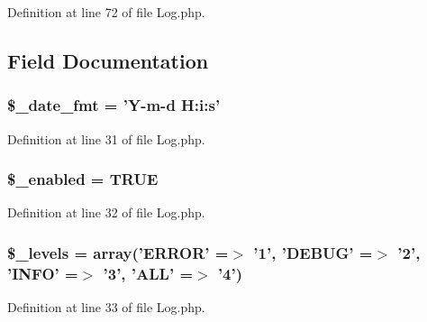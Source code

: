 Definition at line 72 of file Log.\-php.



\subsection{Field Documentation}
\hypertarget{class_c_i___log_aab5c1870169c8e04ede18245f04ad85c}{
\subsubsection[{\$\-\_\-date\-\_\-fmt}]{\setlength{\rightskip}{0pt plus 5cm}\$\-\_\-date\-\_\-fmt = 'Y-\/m-\/{\bf d} H\-:i\-:s'\hspace{0.3cm}{\ttfamily [protected]}}}\label{class_c_i___log_aab5c1870169c8e04ede18245f04ad85c}


Definition at line 31 of file Log.\-php.

\hypertarget{class_c_i___log_af8233d47e8ad3e624ba168154d2f383d}{
\subsubsection[{\$\-\_\-enabled}]{\setlength{\rightskip}{0pt plus 5cm}\$\-\_\-enabled = T\-R\-U\-E\hspace{0.3cm}{\ttfamily [protected]}}}\label{class_c_i___log_af8233d47e8ad3e624ba168154d2f383d}


Definition at line 32 of file Log.\-php.

\hypertarget{class_c_i___log_aeb1c4747136537731b6cfed6f1e64941}{
\subsubsection[{\$\-\_\-levels}]{\setlength{\rightskip}{0pt plus 5cm}\$\-\_\-levels = array('E\-R\-R\-O\-R' =$>$ '1', 'D\-E\-B\-U\-G' =$>$ '2', 'I\-N\-F\-O' =$>$ '3', 'A\-L\-L' =$>$ '4')\hspace{0.3cm}{\ttfamily [protected]}}}\label{class_c_i___log_aeb1c4747136537731b6cfed6f1e64941}


Definition at line 33 of file Log.\-php.

